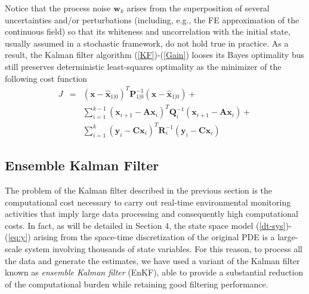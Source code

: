 \documentclass[journal]{IEEEtran}
\newcommand{\mb}{\mathbf}
\newcommand{\ba}{\begin{array}}
\newcommand{\ea}{\end{array}}
\begin{document}
	Notice that the process noise $\mb{w}_k$ arises from the superposition of several uncertainties and/or perturbations (including, e.g., the FE approximation of the continuous field) so that its whiteness  
	and uncorrelation with the initial state, usually assumed in a stochastic framework, do not hold true in practice.
	As a result, the Kalman filter algorithm (\ref{KF})-(\ref{Gain}) looses its Bayes optimality bus still preserves deterministic least-squares optimality as the minimizer
	of the following cost function
	$$\ba{rcl}
	 J & = & \left( \mb{x}-\mb{\hat{x}}_{1|0} \right)^T \mb{P}_{1|0}^{-1}  \left( \mb{x}-\mb{\hat{x}}_{1|0} \right) + \\
	 & & \displaystyle{\sum_{i=1}^{k-1}}  \left( \mb{x}_{i+1} - \mb{A} \mb{x}_i \right)^T \mb{Q}_i^{-1}   \left( \mb{x}_{i+1} - \mb{A} \mb{x}_i \right) +  \\
	 &&  \displaystyle{\sum_{i=1}^{k}}  \left( \mb{y}_{i} - \mb{C} \mb{x}_i \right)^T \mb{R}_i^{-1}   \left( \mb{y}_{i} - \mb{C} \mb{x}_i \right)	 
	 \ea
	$$


	\subsection{Ensemble Kalman Filter}
	
	The problem of the Kalman filter described in the previous section is the computational cost necessary to carry out real-time environmental monitoring activities that imply large data processing 
	and consequently high computational costs. In fact, as will be detailed in Section 4, the state space model  (\ref{dt-sys})-(\ref{eq:y})  arising from the space-time discretization of the original PDE 
	is a large-scale system involving thousands of state variables.
	For this reason, to process all the data and generate the estimates, we have used a variant of the Kalman filter known as \textit{ensemble Kalman filter} (EnKF), able to provide 
	a substantial reduction of the computational burden while retaining good filtering performance.
	
\end{document}
